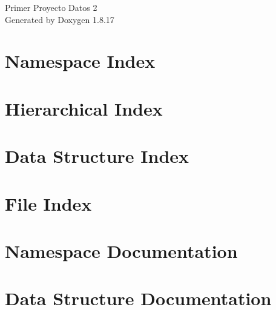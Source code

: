 \let\mypdfximage\pdfximage\def\pdfximage{\immediate\mypdfximage}\documentclass[twoside]{book}
\newcommand{\+}{\discretionary{\mbox{\scriptsize$\hookleftarrow$}}{}{}}
\newcommand{\clearemptydoublepage}{%
  \newpage{\pagestyle{empty}\cleardoublepage}%
}
\begin{document}
\hypersetup{pageanchor=false,
             bookmarksnumbered=true,
             pdfencoding=unicode
            }
\begin{titlepage}
\vspace*{7cm}
\begin{center}%
{\Large Primer Proyecto Datos 2 }\\
\vspace*{1cm}
{\large Generated by Doxygen 1.8.17}\\
\end{center}
\end{titlepage}
\clearemptydoublepage
{}
\tableofcontents
\clearemptydoublepage
{}
\hypersetup{pageanchor=true}

\chapter{Namespace Index}

\chapter{Hierarchical Index}

\chapter{Data Structure Index}

\chapter{File Index}

\chapter{Namespace Documentation}

\chapter{Data Structure Documentation}











\end{document}
